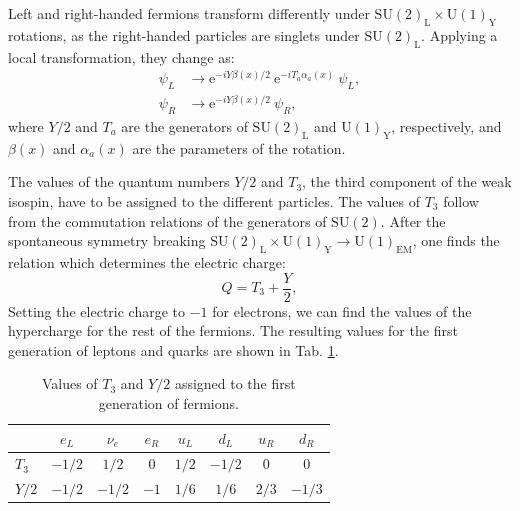 Left and right-handed fermions transform differently under $\mathrm{SU}(2)_{\mathrm{L}}\times\mathrm{U}(1)_{\mathrm{Y}}$ rotations, as the right-handed particles are singlets under $\mathrm{SU}(2)_{\mathrm{L}}$. Applying a local transformation, they change as:
\begin{equation}
	\begin{split}
		\psi_{L} &\longrightarrow \mathrm{e}^{-iY\beta(x)/2}~\mathrm{e}^{-iT_{a}\alpha_{a}(x)}~\psi_{L},\\
		\psi_{R} &\longrightarrow \mathrm{e}^{-iY\beta(x)/2}~\psi_{R},
	\end{split}
\end{equation}
where $Y/2$ and $T_{a}$ are the generators of $\mathrm{SU}(2)_{\mathrm{L}}$ and $\mathrm{U}(1)_{\mathrm{Y}}$, respectively, and $\beta(x)$ and $\alpha_{a}(x)$ are the parameters of the rotation.

The values of the quantum numbers $Y/2$ and $T_{3}$, the third component of the weak isospin, have to be assigned to the different particles. The values of $T_{3}$ follow from the commutation relations of the generators of $\mathrm{SU}(2)$. After the spontaneous symmetry breaking $\mathrm{SU}(2)_{\mathrm{L}}\times\mathrm{U}(1)_{\mathrm{Y}} \rightarrow \mathrm{U}(1)_{\mathrm{EM}}$, one finds the relation which determines the electric charge:
\begin{equation}
	Q = T_{3} + \frac{Y}{2},
\end{equation}
Setting the electric charge to $-1$ for electrons, we can find the values of the hypercharge for the rest of the fermions. The resulting values for the first generation of leptons and quarks are shown in Tab. \ref{tab:sm_charge}.

\begin{table}[t]
	\centering
	\caption{Values of $T_{3}$ and $Y/2$ assigned to the first generation of fermions.}
		\begin{tabular}{l|ccccccc}
			& $e_{L}$ & $\nu_{e}$ & $e_{R}$ & $u_{L}$ & $d_{L}$ & $u_{R}$ & $d_{R}$ \\[2mm] \hline
			\rule{0pt}{1.1\normalbaselineskip}$T_{3}$ & $-1/2$  & $1/2$     & $0$     & $1/2$   & $-1/2$  & $0$     & $0$     \\[2mm]
			$Y/2$   & $-1/2$  & $-1/2$    & $-1$    & $1/6$   & $1/6$   & $2/3$   & $-1/3$ 
		\end{tabular}
	\label{tab:sm_charge}
\end{table}

